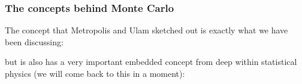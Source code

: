 \documentclass[hyperref={colorlinks=true}]{beamer}
\begin{document}
\begin{frame}%
  \frametitle{The concepts behind Monte Carlo}
  
  The concept that Metropolis and Ulam sketched out is exactly what we have been discussing:
  
  \begin{figure}
    \centering
  \end{figure}
  
  but is also has a very important embedded concept from deep within statistical physics (we will come back to this in a moment):
  

\end{frame}
\end{document}
